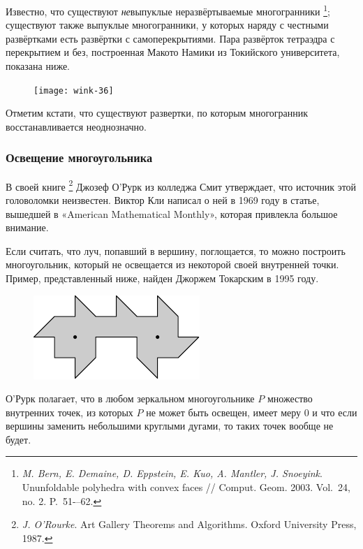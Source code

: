 \documentclass[twoside]{book}
\begin{document}
Известно, что существуют \emph{не}выпуклые неразвёртываемые многогранники%
\footnote{\emph{M. Bern, E. Demaine, D. Eppstein, E. Kuo, A. Mantler,   J. Snoeyink}.  Ununfoldable poly\-hedra with convex faces /\!/ {Comput. Geom.} 2003. Vol.~24, no. 2. P.~51-–62.}; существуют также
выпуклые многогранники, у которых наряду с честными развёртками есть
развёртки с самоперекрытиями.
Пара развёрток тетраэдра с перекрытием
и без, построенная Макото Намики из Токийского университета, показана
ниже.

\begin{figure}[!ht]
\centering
\texttt{[image: wink-36]}
\end{figure}

Отметим кстати, что существуют развертки, по которым  многогранник
восстанавливается неоднозначно.

\subsubsection*{Освещение многоугольника}

В своей книге%
\footnote{\emph{J. O'Rourke}. {Art Gallery Theorems and Algorithms.} Oxford University Press, 1987.}
Джозеф О’Рурк %
из колледжа Смит утверждает, что источник этой головоломки неизвестен.
Виктор Кли написал о ней в 1969 году в статье, вышедшей в «American Mathe\-ma\-tical Monthly», которая привлекла большое внимание. 

Если считать, что луч, попавший в вершину, поглощается, то можно
построить многоугольник, который не освещается из некоторой своей
внутренней точки.
Пример, представленный ниже, найден Джоржем
Токарским в 1995 году.

\begin{figure}[!ht]
\centering
\includegraphics{mp/wink-31}
\end{figure} 

О’Рурк полагает, что в любом зеркальном многоугольнике $P$ множество
внутренних точек, из которых $P$ не может быть освещен, имеет меру 0 и что
если вершины заменить небольшими круглыми дугами, то таких точек
вообще не будет.
\end{document}
